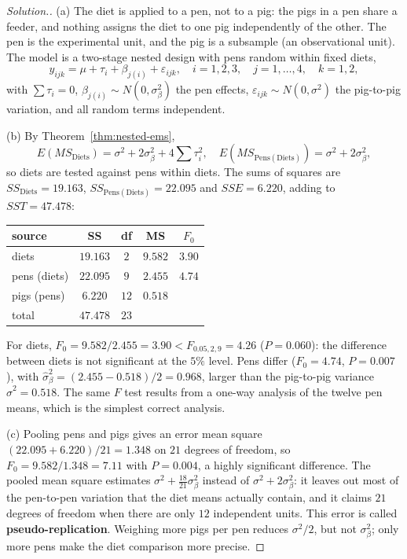 \documentclass[11pt,a4paper]{article}
\numberwithin{equation}{section}
\theoremstyle{definition}
\newenvironment{solution}
  {\renewcommand{\qedsymbol}{}\begin{proof}[\textit{Solution}.]}
  {\end{proof}}
\begin{document}
\begin{solution}
(a) The diet is applied to a pen, not to a pig: the pigs in a pen share a feeder, and nothing assigns the diet to one pig independently of the
other. The pen is the experimental unit, and the pig is a subsample (an observational unit). The model is a two-stage nested design with pens
random within fixed diets,
\[
y_{ijk} = \mu + \tau_i + \beta_{j(i)} + \varepsilon_{ijk} , \quad i = 1, 2, 3 , \quad j = 1, \dots, 4 , \quad k = 1, 2 ,
\]
with $\sum\tau_i = 0$, $\beta_{j(i)} \sim N(0, \sigma^2_\beta)$ the pen effects, $\varepsilon_{ijk} \sim N(0, \sigma^2)$ the pig-to-pig variation, and all random terms independent.

(b) By Theorem~\ref{thm:nested-ems},
\[
E(MS_{\mathrm{Diets}}) = \sigma^2 + 2\sigma^2_\beta + 4\sum\tau_i^2 , \quad E(MS_{\mathrm{Pens(Diets)}}) = \sigma^2 + 2\sigma^2_\beta ,
\]
so diets are tested against pens within diets. The sums of squares are $SS_{\mathrm{Diets}} = 19.163$, $SS_{\mathrm{Pens(Diets)}} = 22.095$ and $SSE = 6.220$, adding
to $SST = 47.478$:
\begin{center}
\begin{tabular}{l|cccc}
source & SS & df & MS & $F_0$ \\
\hline
diets & $19.163$ & $2$ & $9.582$ & $3.90$ \\
pens (diets) & $22.095$ & $9$ & $2.455$ & $4.74$ \\
pigs (pens) & $6.220$ & $12$ & $0.518$ & \\
\hline
total & $47.478$ & $23$ & &
\end{tabular}
\end{center}
For diets, $F_0 = 9.582/2.455 = 3.90 < F_{0.05, 2, 9} = 4.26$ ($P = 0.060$): the difference between diets is not significant at the $5\%$ level. Pens differ
($F_0 = 4.74$, $P = 0.007$), with $\hat\sigma^2_\beta = (2.455 - 0.518)/2 = 0.968$, larger than the pig-to-pig variance $\hat\sigma^2 = 0.518$. The same $F$ test results from a one-way
analysis of the twelve pen means, which is the simplest correct analysis.

(c) Pooling pens and pigs gives an error mean square $(22.095 + 6.220)/21 = 1.348$ on $21$ degrees of freedom, so $F_0 = 9.582/1.348 = 7.11$ with $P = 0.004$, a
highly significant difference. The pooled mean square estimates $\sigma^2 + \frac{18}{21}\sigma^2_\beta$ instead of $\sigma^2 + 2\sigma^2_\beta$: it leaves out most of the pen-to-pen
variation that the diet means actually contain, and it claims $21$ degrees of freedom when there are only $12$ independent units. This error is called
\textbf{pseudo-replication}. Weighing more pigs per pen reduces $\sigma^2/2$, but not $\sigma^2_\beta$; only more pens make the diet comparison more precise.
\end{solution}
\end{document}
